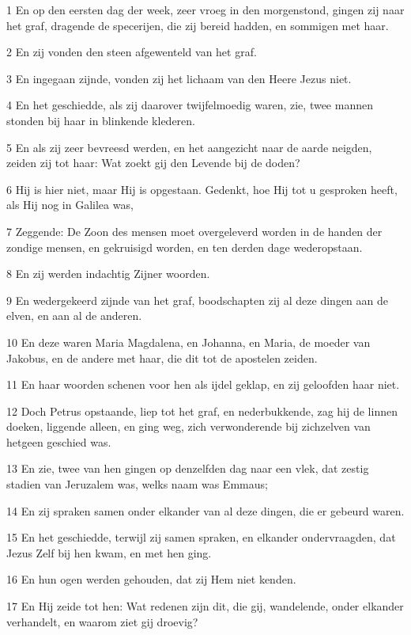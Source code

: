 \par 1 En op den eersten dag der week, zeer vroeg in den morgenstond, gingen zij naar het graf, dragende de specerijen, die zij bereid hadden, en sommigen met haar.
\par 2 En zij vonden den steen afgewenteld van het graf.
\par 3 En ingegaan zijnde, vonden zij het lichaam van den Heere Jezus niet.
\par 4 En het geschiedde, als zij daarover twijfelmoedig waren, zie, twee mannen stonden bij haar in blinkende klederen.
\par 5 En als zij zeer bevreesd werden, en het aangezicht naar de aarde neigden, zeiden zij tot haar: Wat zoekt gij den Levende bij de doden?
\par 6 Hij is hier niet, maar Hij is opgestaan. Gedenkt, hoe Hij tot u gesproken heeft, als Hij nog in Galilea was,
\par 7 Zeggende: De Zoon des mensen moet overgeleverd worden in de handen der zondige mensen, en gekruisigd worden, en ten derden dage wederopstaan.
\par 8 En zij werden indachtig Zijner woorden.
\par 9 En wedergekeerd zijnde van het graf, boodschapten zij al deze dingen aan de elven, en aan al de anderen.
\par 10 En deze waren Maria Magdalena, en Johanna, en Maria, de moeder van Jakobus, en de andere met haar, die dit tot de apostelen zeiden.
\par 11 En haar woorden schenen voor hen als ijdel geklap, en zij geloofden haar niet.
\par 12 Doch Petrus opstaande, liep tot het graf, en nederbukkende, zag hij de linnen doeken, liggende alleen, en ging weg, zich verwonderende bij zichzelven van hetgeen geschied was.
\par 13 En zie, twee van hen gingen op denzelfden dag naar een vlek, dat zestig stadien van Jeruzalem was, welks naam was Emmaus;
\par 14 En zij spraken samen onder elkander van al deze dingen, die er gebeurd waren.
\par 15 En het geschiedde, terwijl zij samen spraken, en elkander ondervraagden, dat Jezus Zelf bij hen kwam, en met hen ging.
\par 16 En hun ogen werden gehouden, dat zij Hem niet kenden.
\par 17 En Hij zeide tot hen: Wat redenen zijn dit, die gij, wandelende, onder elkander verhandelt, en waarom ziet gij droevig?
